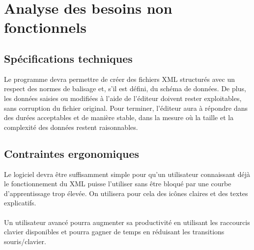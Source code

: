 \section{Analyse des besoins non fonctionnels}
\subsection{Spécifications techniques}
Le programme devra permettre de créer des fichiers XML structurés avec un respect des normes de balisage et, s'il est défini, du schéma de données. De plus, les données saisies ou modifiées à l'aide de l'éditeur doivent rester exploitables, sans corruption du fichier original. Pour terminer, l'éditeur aura à répondre dans des durées acceptables et de manière stable, dans la mesure où la taille et la complexité des données restent raisonnables.
		
\subsection{Contraintes ergonomiques}
Le logiciel devra être suffisamment simple pour qu'un utilisateur connaissant déjà le fonctionnement du XML puisse l'utiliser sans être bloqué par une courbe d'apprentissage trop élevée. On utilisera pour cela des icônes claires et des textes explicatifs.
\paragraph{}
Un utilisateur avancé pourra augmenter sa productivité en utilisant les raccourcis clavier disponibles et pourra gagner de temps en réduisant les transitions souris/clavier.

